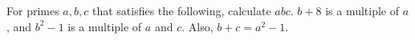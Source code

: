 For primes $a, b,c$ that satisfies the following, calculate $abc$.
$b + 8$ is a multiple of $a$, and $b^2 - 1$ is a multiple of $a$ and $c$. Also, $b + c = a^2 - 1$.